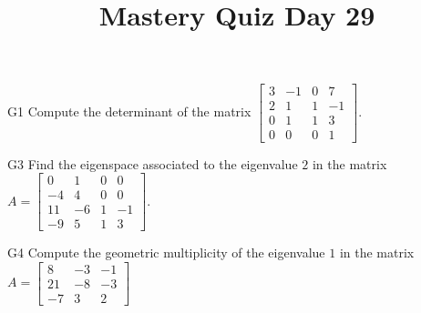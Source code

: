 \documentclass{sbgLAquiz}
\title{Mastery Quiz Day 29 }
\begin{document}
\begin{problem}{G1}
Compute the determinant of the matrix $\begin{bmatrix} 3 & -1 & 0  & 7 \\ 2 & 1 & 1 & -1  \\ 0 & 1 & 1 & 3 \\ 0 & 0 & 0 & 1   \end{bmatrix}$.
\end{problem}

\begin{problem}{G3}
Find the eigenspace associated to the eigenvalue $2$ in the matrix $A=\begin{bmatrix} 0 & 1 & 0 & 0 \\ -4 & 4 & 0 & 0 \\ 11 & -6 & 1 & -1 \\ -9 & 5 & 1 & 3 \end{bmatrix}$.
\end{problem}
\newpage

\begin{problem}{G4}
Compute the geometric multiplicity of the eigenvalue $1$ in the matrix $A=\begin{bmatrix} 8 & -3 & -1 \\ 21 & -8 & -3 \\ -7 & 3  & 2 \end{bmatrix}$
\end{problem}
\end{document}
